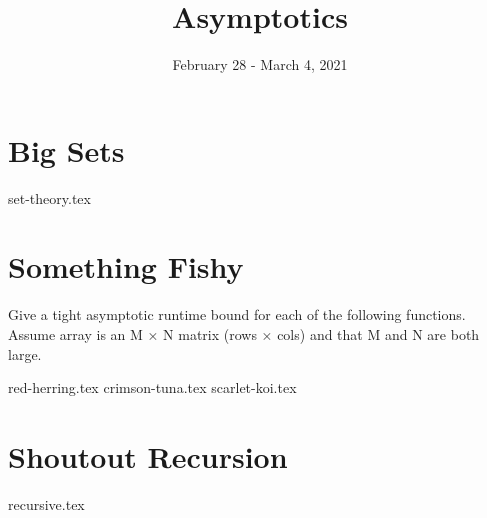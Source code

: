 \documentclass[11pt]{exam}
\title{Asymptotics}
\date{February 28 - March 4, 2021}
\begin{document}
\maketitle


\section{Big Sets}

\begin{questions}
{set-theory.tex}
\end{questions}

\clearpage

\section{Something Fishy}
Give a tight asymptotic runtime bound for each of the following functions. Assume array is an M × N matrix (rows × cols) and that M and N are both large.
\begin{questions}
{red-herring.tex}
{crimson-tuna.tex}
{scarlet-koi.tex}
\end{questions}

\clearpage

\section{Shoutout Recursion}

\begin{questions}
{recursive.tex}
\end{questions}
\end{document}
